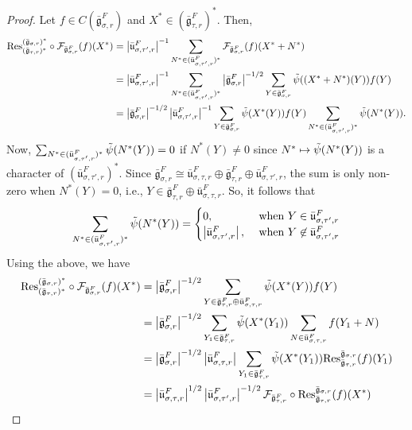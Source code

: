 \documentclass[11 pt]{article}
\numberwithin{equation}{subsection}
\theoremstyle{definition}
\theoremstyle{remark}
\theoremstyle{conjecture}
\newcommand{\bg}{\bar{\mathfrak g}}
\newcommand{\bu}{\bar{\mathfrak u}}
\newcommand{\mcF}{\mathcal F}
\begin{document}
\begin{proof}
    Let $f \in  C\left(\bg_{\sigma,r}^F\right)$ and $X^* \in (\bg_{\tau,r}^F)^*$. Then, 
    \begin{align*}
        \mathrm{Res}^{(\bg_{\sigma,r})^*}_{(\bg_{\tau,r})^*} \circ \mcF_{\bg_{\sigma,r}^F} (f)(X^*) &= \left|\bu_{\sigma,\tau',r}^F\right|^{-1}\sum_{N^* \in (\bu_{\sigma,\tau',r}^F)^*} \mcF_{\bg_{\sigma,r}^F} (f)(X^*+N^*)\\
        &=\left|\bu_{\sigma,\tau',r}^F\right|^{-1}\sum_{N^* \in (\bu_{\sigma,\tau',r}^F)^*}\left|\bg_{\sigma,r}^F\right|^{-1/2}\sum_{Y\in \bg_{\sigma,r}^F}\Tilde\psi(( X^*+N^*)(Y))f(Y)\\
        &=\left|\bg_{\sigma,r}^F\right|^{-1/2}\left|\bu_{\sigma,\tau',r}^F\right|^{-1}\sum_{Y\in \bg_{\sigma,r}^F}\Tilde\psi(X^*(Y))f(Y)\sum_{N^* \in (\bu_{\sigma,\tau',r}^F)^*}\Tilde\psi(N^*(Y)). 
    \end{align*}
    Now, $\sum_{N^* \in (\bu_{\sigma,\tau',r}^F)^*}\Tilde\psi(N^*(Y))=0$ if $N^*(Y)\neq 0$ since $N^* \mapsto \Tilde\psi(N^*(Y))$ is a character of  $(\bu_{\sigma,\tau',r}^F)^*$. Since $\bg_{\sigma,r}^F \cong \bu_{\sigma,\tau,r}^F \oplus \bg_{\tau,r}^F \oplus \bu_{\sigma,\tau',r}^F$, the sum is only non-zero when $N^*(Y)=0$, i.e., $Y \in \bg_{\tau,r}^F \oplus \bu_{\sigma,\tau,r}^F$. So, it follows that 
    \[
    \sum_{N^* \in (\bu_{\sigma,\tau',r}^F)^*}\Tilde\psi(N^*(Y))= \begin{cases}
        0, & \text{ when  } Y \in \bu_{\sigma,\tau',r}^F\\
        \left|\bu_{\sigma,\tau',r}^F\right|, &\text{ when } Y \not \in \bu_{\sigma,\tau',r}^F
    \end{cases}
    \]
    Using the above, we have 
    \begin{align*}
        \mathrm{Res}^{(\bg_{\sigma,r})^*}_{(\bg_{\tau,r})^*} \circ \mcF_{\bg_{\sigma,r}^F} (f)(X^*) &= \left|\bg_{\sigma,r}^F\right|^{-1/2}\sum_{Y \in \bg_{\tau,r}^F \oplus \bu_{\sigma,\tau,r}^F}\Tilde\psi(X^*(Y))f(Y)\\
        &=\left|\bg_{\sigma,r}^F\right|^{-1/2}\sum_{Y_1 \in \bg_{\tau,r}^F}\Tilde\psi(X^*(Y_1)) \sum_{N\in\bu_{\sigma,\tau,r}^F}f(Y_1+N)\\
        &=\left|\bg_{\sigma,r}^F\right|^{-1/2}\left|\bu_{\sigma,\tau,r}^F\right|\sum_{Y_1 \in \bg_{\tau,r}^F}\Tilde\psi(X^*(Y_1))\mathrm{Res}^{\bg_{\sigma,r}}_{\bg_{\tau,r}}(f)(Y_1)\\
        &=\left|\bu_{\sigma,\tau,r}^F\right|^{1/2}\left|\bu_{\sigma,\tau',r}^F\right|^{-1/2}\mcF_{\bg_{\tau,r}^F} \circ \mathrm{Res}^{\bg_{\sigma,r}}_{\bg_{\tau,r}}(f)(X^*)
    \end{align*}
\end{proof}
\end{document}
